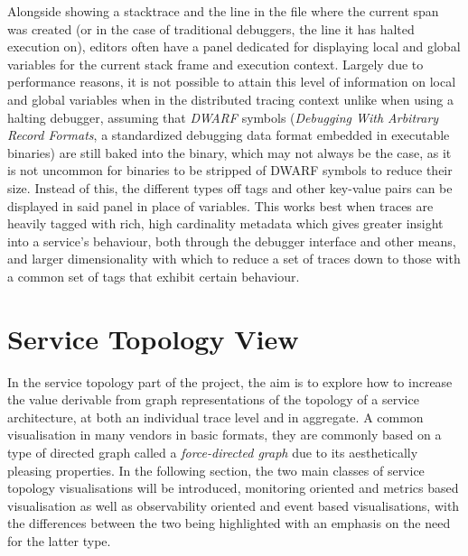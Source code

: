 \documentclass[12pt,pdftex,titlepage]{report}
\begin{document}
            Alongside showing a stacktrace and the line in the file where the current span was created (or in the case of traditional debuggers, the line it has halted execution on),
            editors often have a panel dedicated for displaying local and global variables for the current stack frame and execution context. Largely due to performance reasons, it is
            not possible to attain this level of information on local and global variables when in the distributed tracing context unlike when using a halting debugger, assuming that 
            \textit{DWARF} symbols (\textit{Debugging With Arbitrary Record Formats}, a standardized debugging data format embedded in executable binaries)\cite{dwarf} are still baked 
            into the binary, which may not always be the case, as it is not uncommon for binaries to be stripped of DWARF symbols to reduce their size. Instead of this, the different types off
            tags and other key-value pairs can be displayed in said panel in place of variables. This works best when traces are heavily tagged with rich, high cardinality metadata which gives 
            greater insight into a service's behaviour, both through the debugger interface and other means, and larger dimensionality with which to reduce a set of traces down to those with 
            a common set of tags that exhibit certain behaviour.

        \section{Service Topology View}
            In the service topology part of the project, the aim is to explore how to increase the value derivable from graph representations of the topology of a service architecture, at 
            both an individual trace level and in aggregate. A common visualisation in many vendors in basic formats, they are commonly based on a type of directed graph called a 
            \textit{force-directed graph} due to its aesthetically pleasing properties. In the following section, the two main classes of service topology visualisations will be introduced,
            monitoring oriented and metrics based visualisation as well as observability oriented and event based visualisations, with the differences between the two being highlighted with an 
            emphasis on the need for the latter type.
    
\end{document}

